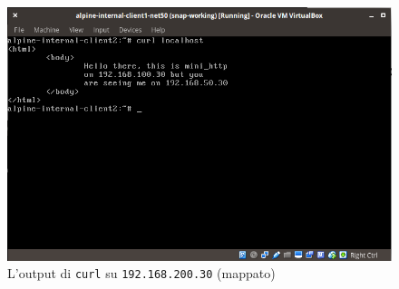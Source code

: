 \begin{figure}
  \includegraphics[scale=0.4]{img/alpine-internal-client1-net50}
  \caption[Output di \texttt{curl} su target 3 in \texttt{net200}]
  {L'output di \texttt{curl} su \texttt{192.168.200.30} (mappato)}
  \label{fig:alpine-internal-client-net200}
\end{figure}

